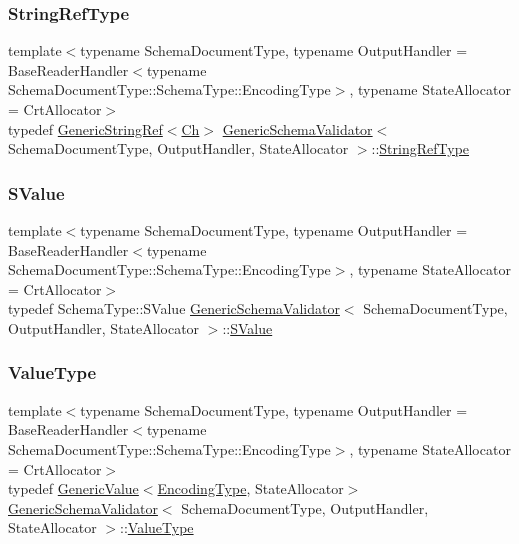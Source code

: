 \subsubsection{\texorpdfstring{String\+Ref\+Type}{StringRefType}}
{\footnotesize\ttfamily template$<$typename Schema\+Document\+Type, typename Output\+Handler = Base\+Reader\+Handler$<$typename Schema\+Document\+Type\+::\+Schema\+Type\+::\+Encoding\+Type$>$, typename State\+Allocator = Crt\+Allocator$>$ \\
typedef \hyperlink{structGenericStringRef}{Generic\+String\+Ref}$<$\hyperlink{classGenericSchemaValidator_a8b7dab5a0cda9cc0adaefb4401d260c1}{Ch}$>$ \hyperlink{classGenericSchemaValidator}{Generic\+Schema\+Validator}$<$ Schema\+Document\+Type, Output\+Handler, State\+Allocator $>$\+::\hyperlink{classGenericSchemaValidator_a604160fcd6af7582e0deccc205309dcf}{String\+Ref\+Type}}

\mbox{\label{classGenericSchemaValidator_a3c004e35c7eb9fa5a28c0ccfb8ac62dc}} 
\subsubsection{\texorpdfstring{S\+Value}{SValue}}
{\footnotesize\ttfamily template$<$typename Schema\+Document\+Type, typename Output\+Handler = Base\+Reader\+Handler$<$typename Schema\+Document\+Type\+::\+Schema\+Type\+::\+Encoding\+Type$>$, typename State\+Allocator = Crt\+Allocator$>$ \\
typedef Schema\+Type\+::\+S\+Value \hyperlink{classGenericSchemaValidator}{Generic\+Schema\+Validator}$<$ Schema\+Document\+Type, Output\+Handler, State\+Allocator $>$\+::\hyperlink{classGenericSchemaValidator_a3c004e35c7eb9fa5a28c0ccfb8ac62dc}{S\+Value}}

\mbox{\label{classGenericSchemaValidator_a435890a2dddeecb896d4ac76de03ca68}} 
\subsubsection{\texorpdfstring{Value\+Type}{ValueType}}
{\footnotesize\ttfamily template$<$typename Schema\+Document\+Type, typename Output\+Handler = Base\+Reader\+Handler$<$typename Schema\+Document\+Type\+::\+Schema\+Type\+::\+Encoding\+Type$>$, typename State\+Allocator = Crt\+Allocator$>$ \\
typedef \hyperlink{classGenericValue}{Generic\+Value}$<$\hyperlink{classGenericSchemaValidator_acf1c5361bb96da87d23167d8720b1ea5}{Encoding\+Type}, State\+Allocator$>$ \hyperlink{classGenericSchemaValidator}{Generic\+Schema\+Validator}$<$ Schema\+Document\+Type, Output\+Handler, State\+Allocator $>$\+::\hyperlink{classGenericSchemaValidator_a435890a2dddeecb896d4ac76de03ca68}{Value\+Type}}



